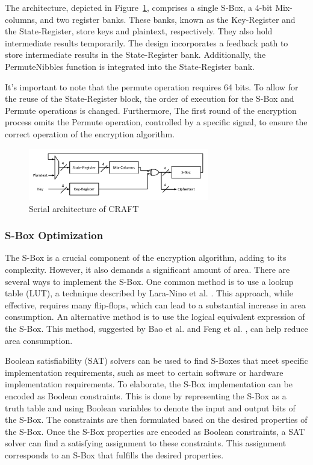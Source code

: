 \documentclass[final,5p,times,twocolumn]{elsarticle}
\begin{document}
The architecture, depicted in Figure~\ref{fig3}, comprises a single S-Box, a 4-bit Mix-columns, and two register banks.
These banks, known as the Key-Register and the State-Register, store keys and plaintext, respectively.
They also hold intermediate results temporarily.
The design incorporates a feedback path to store intermediate results in the State-Register bank.
Additionally, the PermuteNibbles function is integrated into the State-Register bank.

It's important to note that the permute operation requires 64 bits.
To allow for the reuse of the State-Register block, the order of execution for the S-Box and Permute operations is changed.
Furthermore, The first round of the encryption process omits the Permute operation, controlled by a specific signal, to ensure the correct operation of the encryption algorithm.

\begin{figure}[h]%
    \centering
    \includegraphics[width=0.7\textwidth]{./fig/serial-archticture.pdf}
    \caption{Serial architecture of CRAFT}\label{fig3}
\end{figure}


\subsubsection{S-Box Optimization }\label{subsubsec1}


The S-Box is a crucial component of the encryption algorithm, adding to its complexity. However, it also demands a significant amount of area. There are several ways to implement the S-Box. One common method is to use a lookup table (LUT), a technique described by Lara-Nino et al. \cite{LaraNino2017}. This approach, while effective, requires many flip-flops, which can lead to a substantial increase in area consumption. An alternative method is to use the logical equivalent expression of the S-Box. This method, suggested by Bao et al. \cite{bao2019peigen} and Feng et al. \cite{Feng2023}, can help reduce area consumption.

Boolean satisfiability (SAT) solvers can be used to find S-Boxes that meet specific implementation requirements, such as meet to certain software or hardware implementation requirements. To elaborate, the S-Box implementation can be encoded as Boolean constraints. This is done by representing the S-Box as a truth table and using Boolean variables to denote the input and output bits of the S-Box. The constraints are then formulated based on the desired properties of the S-Box. Once the S-Box properties are encoded as Boolean constraints, a SAT solver can find a satisfying assignment to these constraints. This assignment corresponds to an S-Box that fulfills the desired properties.
\end{document}
